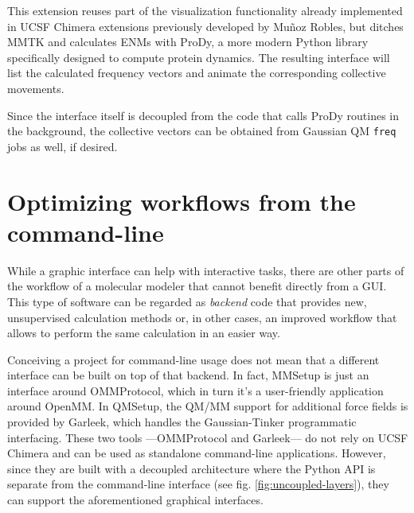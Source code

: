 This extension reuses part of the visualization functionality already implemented in UCSF Chimera extensions previously developed by Muñoz Robles,\cite{MunozRobles2014a} but ditches MMTK\cite{mmtk} and calculates ENMs with ProDy,\cite{prody} a more modern Python library specifically designed to compute protein dynamics. The resulting interface will list the calculated frequency vectors and animate the corresponding collective movements.

Since the interface itself is decoupled from the code that calls ProDy routines in the background, the collective vectors can be obtained from Gaussian QM \texttt{freq} jobs as well, if desired.


\section{Optimizing workflows from the command-line}
While a graphic interface can help with interactive tasks, there are other parts of the workflow of a molecular modeler that cannot benefit directly from a GUI. This type of software can be regarded as \textit{backend} code that provides new, unsupervised calculation methods or, in other cases, an improved workflow that allows to perform the same calculation in an easier way.

Conceiving a project for command-line usage does not mean that a different interface can be built on top of that backend. In fact, MMSetup is just an interface around OMMProtocol, which in turn it's a user-friendly application around OpenMM. In QMSetup, the QM/MM support for additional force fields is provided by Garleek, which handles the Gaussian-Tinker programmatic interfacing. These two tools ---OMMProtocol and Garleek--- do not rely on UCSF Chimera and can be used as standalone command-line applications. However, since they are built with a decoupled architecture where the Python API is separate from the command-line interface (see fig. \ref{fig:uncoupled-layers}), they can support the aforementioned graphical interfaces.


